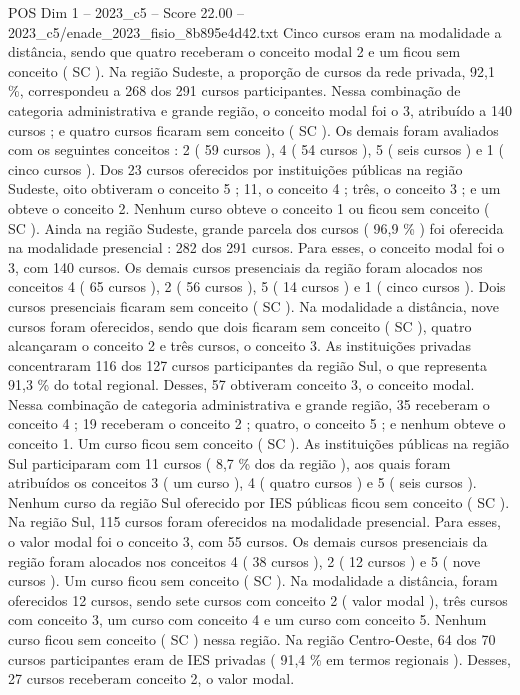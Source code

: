 \begin{textsample}{POS Dim 1 – 2023\_c5 – Score 22.00 – 2023\_c5/enade\_2023\_fisio\_8b895e4d42.txt}
Cinco cursos eram na modalidade a distância, sendo que quatro receberam o conceito modal 2 e um ficou sem conceito ( SC ).
Na região Sudeste, a proporção de cursos da rede privada, 92,1 \%, correspondeu a 268 dos 291 cursos participantes.
Nessa combinação de categoria administrativa e grande região, o conceito modal foi o 3, atribuído a 140 cursos ; e quatro cursos ficaram sem conceito ( SC ).
Os demais foram avaliados com os seguintes conceitos : 2 ( 59 cursos ), 4 ( 54 cursos ), 5 ( seis cursos ) e 1 ( cinco cursos ).
Dos 23 cursos oferecidos por instituições públicas na região Sudeste, oito obtiveram o conceito 5 ; 11, o conceito 4 ; três, o conceito 3 ; e um obteve o conceito 2.
Nenhum curso obteve o conceito 1 ou ficou sem conceito ( SC ).
Ainda na região Sudeste, grande parcela dos cursos ( 96,9 \% ) foi oferecida na modalidade presencial : 282 dos 291 cursos.
Para esses, o conceito modal foi o 3, com 140 cursos.
Os demais cursos presenciais da região foram alocados nos conceitos 4 ( 65 cursos ), 2 ( 56 cursos ), 5 ( 14 cursos ) e 1 ( cinco cursos ).
Dois cursos presenciais ficaram sem conceito ( SC ).
Na modalidade a distância, nove cursos foram oferecidos, sendo que dois ficaram sem conceito ( SC ), quatro alcançaram o conceito 2 e três cursos, o conceito 3.
As instituições privadas concentraram 116 dos 127 cursos participantes da região Sul, o que representa 91,3 \% do total regional.
Desses, 57 obtiveram conceito 3, o conceito modal.
Nessa combinação de categoria administrativa e grande região, 35 receberam o conceito 4 ; 19 receberam o conceito 2 ; quatro, o conceito 5 ; e nenhum obteve o conceito 1.
Um curso ficou sem conceito ( SC ).
As instituições públicas na região Sul participaram com 11 cursos ( 8,7 \% dos da região ), aos quais foram atribuídos os conceitos 3 ( um curso ), 4 ( quatro cursos ) e 5 ( seis cursos ).
Nenhum curso da região Sul oferecido por IES públicas ficou sem conceito ( SC ).
Na região Sul, 115 cursos foram oferecidos na modalidade presencial.
Para esses, o valor modal foi o conceito 3, com 55 cursos.
Os demais cursos presenciais da região foram alocados nos conceitos 4 ( 38 cursos ), 2 ( 12 cursos ) e 5 ( nove cursos ).
Um curso ficou sem conceito ( SC ).
Na modalidade a distância, foram oferecidos 12 cursos, sendo sete cursos com conceito 2 ( valor modal ), três cursos com conceito 3, um curso com conceito 4 e um curso com conceito 5.
Nenhum curso ficou sem conceito ( SC ) nessa região.
Na região Centro-Oeste, 64 dos 70 cursos participantes eram de IES privadas ( 91,4 \% em termos regionais ).
Desses, 27 cursos receberam conceito 2, o valor modal.

\end{textsample}
